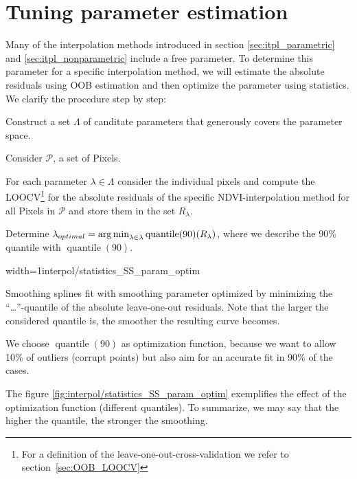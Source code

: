 \section{Tuning parameter estimation}{ \label{sec:itpl_param_est}
	Many of the interpolation methods introduced in section \ref{sec:itpl_parametric} and \ref{sec:itpl_nonparametric} include a free parameter. To determine this parameter for a specific interpolation method, we will estimate the absolute residuals using OOB estimation and then optimize the parameter using statistics. We clarify the procedure step by step:	
	\begin{Nenumerate}
		\item Construct a set $\Lambda$ of canditate parameters that generously covers the parameter space.
		\item Consider $\mathcal{P}$, a set of Pixels.
		\item For each parameter $\lambda \in \Lambda$ consider the individual pixels and compute the LOOCV\footnote{For a definition of the leave-one-out-cross-validation we refer to section~\ref{sec:OOB_LOOCV}} for the absolute residuals of the specific NDVI-interpolation method for all Pixels in $\mathcal{P}$ and store them in the set $R_\lambda$. 
		\item Determine $\lambda_{optimal} = \operatorname*{arg\, min}_{\lambda\in\lambda}\operatorname{quantile}(90)(R_\lambda)$, where we describe the 90\% quantile with $\operatorname{quantile}(90)$.
	\end{Nenumerate}

	\begin{my_figure}[h]{width=1\textwidth}{interpol/statistics_SS_param_optim}
		\caption{Smoothing splines fit with smoothing parameter optimized by minimizing the ``\dots''-quantile of the absolute leave-one-out residuals. Note that the larger the considered quantile is, the smoother the resulting curve becomes.}
		\label{fig:interpol/statistics_SS_param_optim}
	\end{my_figure}

	We choose $\operatorname{quantile}(90)$ as optimization function, because we want to allow 10\% of outliers (corrupt points) but also aim for an accurate fit in 90\% of the cases.  
	
	The figure \ref{fig:interpol/statistics_SS_param_optim} exemplifies the effect of the optimization function (different quantiles). To summarize, we may say that the higher the quantile, the stronger the smoothing. 
}


